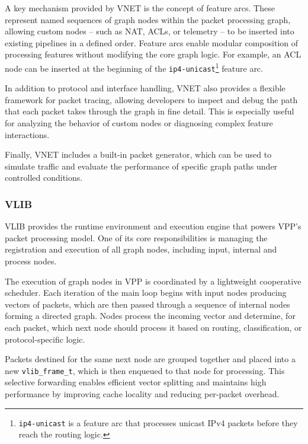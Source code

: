 A key mechanism provided by VNET is the concept of feature arcs. 
These represent named sequences of graph nodes within the packet processing graph, allowing custom nodes -- such as NAT, ACLs, or telemetry -- to be inserted into existing pipelines in a defined order. 
Feature arcs enable modular composition of processing features without modifying the core graph logic. For example, an ACL node can be inserted at the beginning of the 
\texttt{ip4-unicast}\footnote{\texttt{ip4-unicast} is a feature arc that processes unicast IPv4 packets before they reach the routing logic.} feature arc.

In addition to protocol and interface handling, VNET also provides a flexible framework for packet tracing, 
allowing developers to inspect and debug the path that each packet takes through the graph in fine detail. 
This is especially useful for analyzing the behavior of custom nodes or diagnosing complex feature interactions.

Finally, VNET includes a built-in packet generator, which can be used to simulate traffic and evaluate the performance of specific graph paths under 
controlled conditions.\cite{fdio-vpp-vnet-2506, fdio-vpp-featurearcs-2506}

\subsubsection{VLIB}
VLIB provides the runtime environment and execution engine that powers VPP’s packet processing model.
One of its core responsibilities is managing the registration and execution of all graph nodes, including input, internal and process nodes.

The execution of graph nodes in VPP is coordinated by a lightweight cooperative scheduler.
Each iteration of the main loop begins with input nodes producing vectors of packets, which are then passed through a sequence of internal nodes forming a directed graph.
Nodes process the incoming vector and determine, for each packet, which next node should process it based on routing, classification, or protocol-specific logic.

Packets destined for the same next node are grouped together and placed into a new \texttt{vlib\_frame\_t}, which is then enqueued to that node for processing.
This selective forwarding enables efficient vector splitting and maintains high performance by improving cache locality and reducing per-packet overhead.


